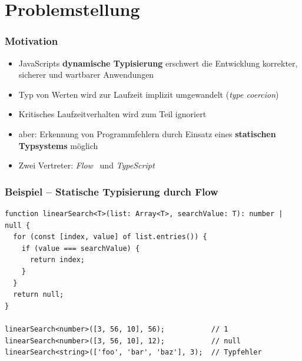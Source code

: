 




  \section{Problemstellung}

    \begin{frame}
      \frametitle{Motivation}
      \begin{itemize}
        \item JavaScripts \textbf{dynamische Typisierung} erschwert die Entwicklung korrekter, sicherer und wartbarer Anwendungen~\autocite{NIKHIL:2014,PRADEL:2015,BIERMAN:2014}
        \item Typ von Werten wird zur Laufzeit implizit umgewandelt (\textit{type coercion})
        \item Kritisches Laufzeitverhalten wird zum Teil ignoriert
        \item aber: Erkennung von Programmfehlern durch Einsatz eines \textbf{statischen Typsystems} möglich
        \item Zwei Vertreter: \textit{Flow}~\autocite{FLOW:PAPER} und \textit{TypeScript}~\autocite{TYPESCRIPT:SPEC}
      \end{itemize}
    \end{frame}

    \begin{frame}[fragile]
      \frametitle{Beispiel -- Statische Typisierung durch Flow}
      \begin{lstlisting}
function linearSearch<T>(list: Array<T>, searchValue: T): number | null {
  for (const [index, value] of list.entries()) {
    if (value === searchValue) {
      return index;
    }
  }
  return null;
}

linearSearch<number>([3, 56, 10], 56);           // 1
linearSearch<number>([3, 56, 10], 12);           // null
linearSearch<string>(['foo', 'bar', 'baz'], 3);  // Typfehler
      \end{lstlisting}
    \end{frame}

